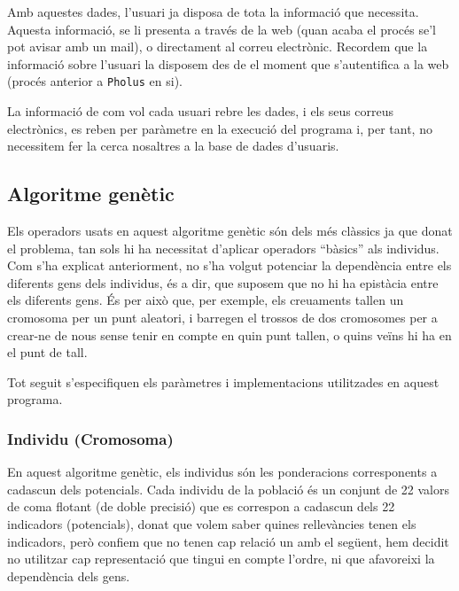 Amb aquestes dades, l'usuari ja disposa de tota la informació que necessita.
Aquesta informació, se li presenta a través de la web (quan acaba el procés se'l
pot avisar amb un mail), o directament al correu electrònic.  Recordem que la
informació sobre l'usuari la disposem des de el moment que s'autentifica a la web
(procés anterior a \texttt{Pholus} en si).

La informació de com vol cada usuari rebre les dades, i els seus correus
electrònics, es reben per paràmetre en la execució del programa i, per tant, no
necessitem fer la cerca nosaltres a la base de dades d'usuaris.



\subsection{Algoritme genètic} %
\label{sub:Algoritme genetic}

Els operadors usats en aquest algoritme genètic són dels més clàssics ja que
donat el problema, tan sols hi ha necessitat d'aplicar operadors ``bàsics'' als
individus.  Com s'ha explicat anteriorment, no s'ha volgut potenciar la
dependència entre els diferents gens dels individus, és a dir, que suposem que
no hi ha epistàcia entre els diferents gens.  És per això que, per exemple, els
creuaments tallen un cromosoma per un punt aleatori, i barregen el trossos de
dos cromosomes per a crear-ne de nous sense tenir en compte en quin punt tallen,
o quins veïns hi ha en el punt de tall.

Tot seguit s'especifiquen els paràmetres i implementacions utilitzades en aquest
programa.

\subsubsection{Individu (Cromosoma)}
\label{ssub:individu (cromosoma)}

En aquest algoritme genètic, els individus són les ponderacions corresponents a
cadascun dels potencials.  Cada individu de la població és un conjunt de 22 valors de
coma flotant (de doble precisió) que es correspon a cadascun dels 22 indicadors
(potencials),  donat que volem saber quines rellevàncies tenen els indicadors, però
confiem que no tenen cap relació un amb el següent, hem decidit no utilitzar cap
representació que tingui en compte l'ordre, ni que afavoreixi la dependència
dels gens. 


